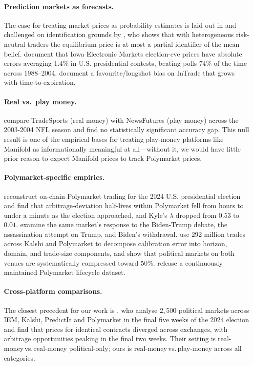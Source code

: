 \documentclass{article}
\begin{document}
\paragraph{Prediction markets as forecasts.} The case for treating market prices as probability estimates is laid out in \citet{wolfers2004prediction} and challenged on identification grounds by \citet{manski2006interpreting}, who shows that with heterogeneous risk-neutral traders the equilibrium price is at most a partial identifier of the mean belief. \citet{berg2008longrun} document that Iowa Electronic Markets election-eve prices have absolute errors averaging $1.4\%$ in U.S. presidential contests, beating polls $74\%$ of the time across 1988--2004. \citet{page2013calibrated} document a favourite/longshot bias on InTrade that grows with time-to-expiration.

\paragraph{Real vs.\ play money.} \citet{servan2004does} compare TradeSports (real money) with NewsFutures (play money) across the 2003-2004 NFL season and find no statistically significant accuracy gap. This null result is one of the empirical bases for treating play-money platforms like Manifold as informationally meaningful at all---without it, we would have little prior reason to expect Manifold prices to track Polymarket prices.

\paragraph{Polymarket-specific empirics.} \citet{tsang2026anatomy} reconstruct on-chain Polymarket trading for the 2024 U.S. presidential election and find that arbitrage-deviation half-lives within Polymarket fell from hours to under a minute as the election approached, and Kyle's $\lambda$ dropped from $0.53$ to $0.01$. \citet{tsang2026shocks} examine the same market's response to the Biden-Trump debate, the assassination attempt on Trump, and Biden's withdrawal. \citet{le2026decomposing} use 292 million trades across Kalshi and Polymarket to decompose calibration error into horizon, domain, and trade-size components, and show that political markets on both venues are systematically compressed toward $50\%$. \citet{jia2026unlocking} release a continuously maintained Polymarket lifecycle dataset.

\paragraph{Cross-platform comparisons.} The closest precedent for our work is \citet{clinton2025prediction}, who analyse $2{,}500$ political markets across IEM, Kalshi, PredictIt and Polymarket in the final five weeks of the 2024 election and find that prices for identical contracts diverged across exchanges, with arbitrage opportunities peaking in the final two weeks. Their setting is real-money\,vs.\,real-money political-only; ours is real-money\,vs.\,play-money across all categories.
\end{document}
